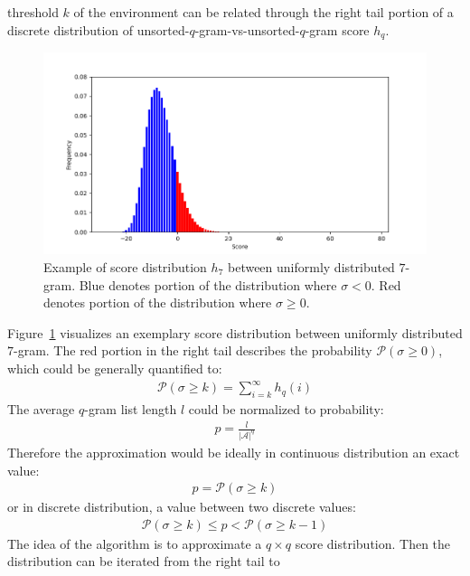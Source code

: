 \documentclass[twoside,a4paper,bsc]{master}
\newcommand{\Qgram}[1]{\(#1\)-gram}
\begin{document}
threshold \(k\) of the environment can be related through the right tail
portion of a discrete distribution of
unsorted-\Qgram{q}-vs-unsorted-\Qgram{q} score \(h_q\).
\begin{figure}[t]
\begin{center}
\includegraphics[scale=0.6]{graphics/distribution.png}
\end{center}
\caption{Example of score distribution \(h_7\) between uniformly
distributed \Qgram{7}. Blue denotes portion of the distribution where
\(\sigma < 0\). Red denotes portion of the distribution where \(\sigma \geq
0\).}
\label{fig:distrbution}
\end{figure}
Figure~\ref{fig:distrbution} visualizes an exemplary score distribution
between uniformly distributed \Qgram{7}. The red portion in the right
tail describes the probability \(\mathcal{P}(\sigma \geq 0)\), which could
be generally quantified to:
\begin{align}
\mathcal{P}(\sigma \geq k) = \sum_{i = k}^\infty h_q(i)
\end{align}
The average \Qgram{q} list length \(l\) could be normalized to
probability:
\begin{align}
p = \frac{l}{|\mathcal{A}|^q}
\end{align}
Therefore the approximation would be ideally in continuous distribution an
exact value:
\begin{align}
p = \mathcal{P}(\sigma \geq k)
\end{align}
or in discrete distribution, a value between two discrete values:
\begin{align}
\mathcal{P}(\sigma \geq k) \leq p < \mathcal{P}(\sigma \geq
k-1)\label{eq:distribution}
\end{align}
The idea of the algorithm is to approximate a \(q\times q\) score
distribution. Then the distribution can be iterated from the right tail to
\end{document}
